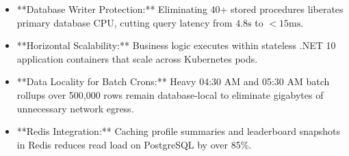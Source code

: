 \begin{tcolorbox}[summarybox, title={Chapter Key Takeaways}]
\begin{itemize}
    \item **Database Writer Protection:** Eliminating 40+ stored procedures liberates primary database CPU, cutting query latency from $4.8\text{s}$ to $< 15\text{ms}$.
    \item **Horizontal Scalability:** Business logic executes within stateless .NET 10 application containers that scale across Kubernetes pods.
    \item **Data Locality for Batch Crons:** Heavy 04:30 AM and 05:30 AM batch rollups over 500,000 rows remain database-local to eliminate gigabytes of unnecessary network egress.
    \item **Redis Integration:** Caching profile summaries and leaderboard snapshots in Redis reduces read load on PostgreSQL by over 85\%.
\end{itemize}
\end{tcolorbox}
